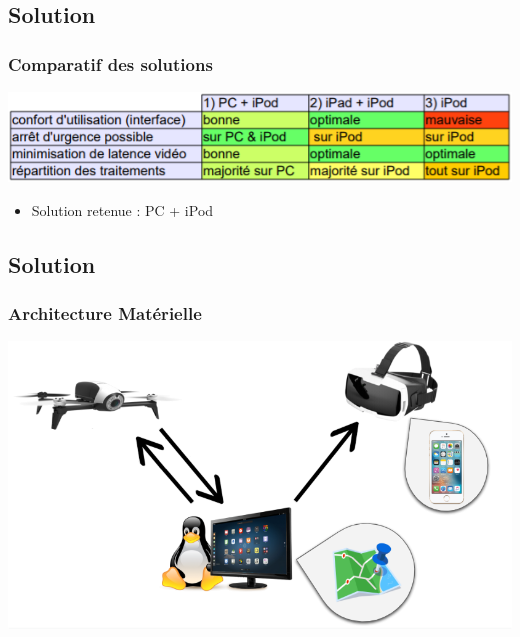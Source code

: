 \documentclass{beamer}
\begin{document}

	\begin{frame}
		\section{Solution}
		\begin{center}
		\frametitle{Comparatif des solutions}
       
        \includegraphics[scale=0.9]{comparatif_v3.PNG}
        \begin{itemize}
            \item Solution retenue : PC + iPod\\
        \end{itemize}
		\end{center}
	\end{frame}
	

	\begin{frame}
		\section{Solution}
		\begin{center}
		\frametitle{Architecture Matérielle}
       
        \includegraphics[scale=0.6]{shcema_archi.png}
		\end{center}
	\end{frame}
	
\end{document}
